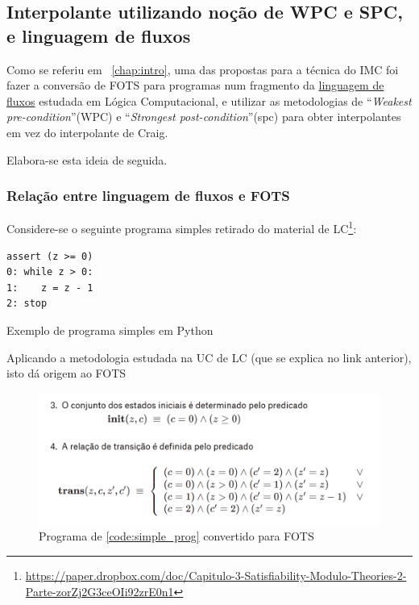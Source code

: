 \documentclass[11pt,a4paper]{report}%
\newenvironment{code}{\captionsetup{type=listing}}{}
\def\lc{Lógica Computacional\xspace}
\def\wpc{``\textit{Weakest pre-condition}''\xspace}
\def\spc{``\textit{Strongest post-condition}''\xspace}
\begin{document}
\subsection{Interpolante utilizando noção de WPC e SPC, e linguagem de fluxos}
\label{imc_wpc_spc}

Como se referiu em ~\ref{chap:intro}, uma das propostas para a técnica do IMC
foi fazer a conversão de FOTS para programas num fragmento da \href{https://paper.dropbox.com/doc/Capitulo-5-Verificacao-Formal-de-Software-e95D7fVpc0dArh4pnVl1l#:uid=847823822173927851567448&h2=Denota%C3%A7%C3%A3o-WPC-e-sua-linguagem-}{linguagem de fluxos} estudada em \lc, e utilizar as metodologias de \wpc (WPC) e \spc (spc)
para obter interpolantes em vez do interpolante de Craig.

Elabora-se esta ideia de seguida.

\subsubsection{Relação entre linguagem de fluxos e FOTS}

Considere-se o seguinte programa simples retirado do material de LC\footnote{\url{https://paper.dropbox.com/doc/Capitulo-3-Satisfiability-Modulo-Theories-2-Parte-zorZj2G3ceOIi92zrE0n1}}:

\begin{code}
\begin{verbatim}
assert (z >= 0)
0: while z > 0:
1:    z = z - 1
2: stop
\end{verbatim}
\caption{Exemplo de programa simples em Python}
\label{code:simple_prog}
\end{code}

Aplicando a metodologia estudada na UC de LC (que se explica no link anterior), isto dá
origem ao FOTS

\begin{figure}[H]
      \centering
      \includegraphics[scale=0.85]{simple_prog.png}
      \caption{Programa de \ref{code:simple_prog} convertido para FOTS}
      \label{fig:simple_fots}
\end{figure}
\end{document}
